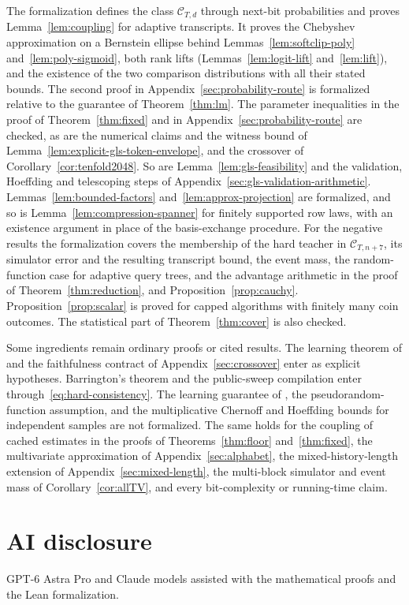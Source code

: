 \documentclass[11pt]{article}
\theoremstyle{definition}
\theoremstyle{remark}
\begin{document}
The formalization defines the class $\mathcal C_{T,d}$ through next-bit probabilities and proves Lemma~\ref{lem:coupling} for adaptive transcripts. It proves the Chebyshev approximation on a Bernstein ellipse behind Lemmas~\ref{lem:softclip-poly} and~\ref{lem:poly-sigmoid}, both rank lifts (Lemmas~\ref{lem:logit-lift} and~\ref{lem:lift}), and the existence of the two comparison distributions with all their stated bounds. The second proof in Appendix~\ref{sec:probability-route} is formalized relative to the guarantee of Theorem~\ref{thm:lm}. The parameter inequalities in the proof of Theorem~\ref{thm:fixed} and in Appendix~\ref{sec:probability-route} are checked, as are the numerical claims and the witness bound of Lemma~\ref{lem:explicit-gls-token-envelope}, and the crossover of Corollary~\ref{cor:tenfold2048}. So are Lemma~\ref{lem:gls-feasibility} and the validation, Hoeffding and telescoping steps of Appendix~\ref{sec:gls-validation-arithmetic}. Lemmas~\ref{lem:bounded-factors} and~\ref{lem:approx-projection} are formalized, and so is Lemma~\ref{lem:compression-spanner} for finitely supported row laws, with an existence argument in place of the basis-exchange procedure. For the negative results the formalization covers the membership of the hard teacher in $\mathcal C_{T,n+7}$, its simulator error and the resulting transcript bound, the event mass, the random-function case for adaptive query trees, and the advantage arithmetic in the proof of Theorem~\ref{thm:reduction}, and Proposition~\ref{prop:cauchy}. Proposition~\ref{prop:scalar} is proved for capped algorithms with finitely many coin outcomes. The statistical part of Theorem~\ref{thm:cover} is also checked.

Some ingredients remain ordinary proofs or cited results. The learning theorem of \citet{liu-moitra} and the faithfulness contract of Appendix~\ref{sec:crossover} enter as explicit hypotheses. Barrington's theorem and the public-sweep compilation enter through~\eqref{eq:hard-consistency}. The learning guarantee of \citet[Theorem~5.11]{gls2}, the pseudorandom-function assumption, and the multiplicative Chernoff and Hoeffding bounds for independent samples are not formalized. The same holds for the coupling of cached estimates in the proofs of Theorems~\ref{thm:floor} and~\ref{thm:fixed}, the multivariate approximation of Appendix~\ref{sec:alphabet}, the mixed-history-length extension of Appendix~\ref{sec:mixed-length}, the multi-block simulator and event mass of Corollary~\ref{cor:allTV}, and every bit-complexity or running-time claim.



\section*{AI disclosure}

GPT-6 Astra Pro and Claude models assisted with the mathematical proofs and the Lean formalization.
\end{document}
